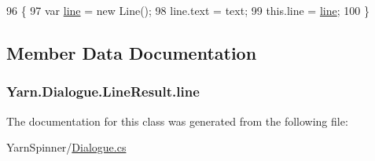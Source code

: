 \begin{DoxyCode}
96                                             \{
97                 var \hyperlink{a00050_abfbb0ea840b02acd0ecdc72c5b120257}{line} = \textcolor{keyword}{new} Line();
98                 line.text = text;
99                 this.line = \hyperlink{a00050_abfbb0ea840b02acd0ecdc72c5b120257}{line};
100             \}
\end{DoxyCode}


\subsection{Member Data Documentation}
\hypertarget{a00050_abfbb0ea840b02acd0ecdc72c5b120257}{
\subsubsection[{line}]{ Yarn.\-Dialogue.\-Line\-Result.\-line}}\label{a00050_abfbb0ea840b02acd0ecdc72c5b120257}


The documentation for this class was generated from the following file\-:\begin{DoxyCompactItemize}
\item 
Yarn\-Spinner/\hyperlink{a00117}{Dialogue.\-cs}\end{DoxyCompactItemize}
